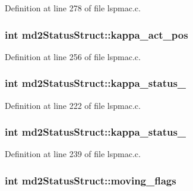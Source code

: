 Definition at line 278 of file lspmac.\-c.

\hypertarget{structmd2StatusStruct_ac384fb7073387dd5dcb2e85a00ec8a77}{
\subsubsection[{kappa\-\_\-act\-\_\-pos}]{\setlength{\rightskip}{0pt plus 5cm}int md2\-Status\-Struct\-::kappa\-\_\-act\-\_\-pos}}\label{structmd2StatusStruct_ac384fb7073387dd5dcb2e85a00ec8a77}


Definition at line 256 of file lspmac.\-c.

\hypertarget{structmd2StatusStruct_ab152694bc32d37c1d180f55e8d282020}{
\subsubsection[{kappa\-\_\-status\-\_\-1}]{\setlength{\rightskip}{0pt plus 5cm}int md2\-Status\-Struct\-::kappa\-\_\-status\-\_}}\label{structmd2StatusStruct_ab152694bc32d37c1d180f55e8d282020}


Definition at line 222 of file lspmac.\-c.

\hypertarget{structmd2StatusStruct_af6891f5f8dcfc62668f64c583042c6bc}{
\subsubsection[{kappa\-\_\-status\-\_\-2}]{\setlength{\rightskip}{0pt plus 5cm}int md2\-Status\-Struct\-::kappa\-\_\-status\-\_}}\label{structmd2StatusStruct_af6891f5f8dcfc62668f64c583042c6bc}


Definition at line 239 of file lspmac.\-c.

\hypertarget{structmd2StatusStruct_aac82f8e97fa39ea9be7823dd1d308986}{
\subsubsection[{moving\-\_\-flags}]{\setlength{\rightskip}{0pt plus 5cm}int md2\-Status\-Struct\-::moving\-\_\-flags}}\label{structmd2StatusStruct_aac82f8e97fa39ea9be7823dd1d308986}


